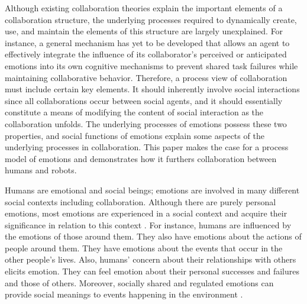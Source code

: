 Although existing collaboration theories explain the important elements of a
collaboration structure, the underlying processes required to dynamically
create, use, and maintain the elements of this structure are largely
unexplained. For instance, a general mechanism has yet to be developed that
allows an agent to effectively integrate the influence of its collaborator's
perceived or anticipated emotions into its own cognitive mechanisms to prevent
shared task failures while maintaining collaborative behavior. Therefore, a
process view of collaboration must include certain key elements. It should
inherently involve social interactions since all collaborations occur between
social agents, and it should essentially constitute a means of modifying the
content of social interaction as the collaboration unfolds. The underlying
processes of emotions possess these two properties, and social functions of
emotions explain some aspects of the underlying processes in collaboration. This
paper makes the case for a process model of emotions and demonstrates how it
furthers collaboration between humans and robots.

Humans are emotional and social beings; emotions are involved in many different
social contexts including collaboration. Although there are purely personal
emotions, most emotions are experienced in a social context and acquire their
significance in relation to this context
\cite{parkinson:emotion-social-interaction}. For instance, humans are influenced
by the emotions of those around them. They also have emotions about the actions
of people around them. They have emotions about the events that occur in the
other people's lives. Also, humans' concern about their relationships with
others elicits emotion. They can feel emotion about their personal successes and
failures and those of others. Moreover, socially shared and regulated emotions
can provide social meanings to events happening in the environment
\cite{wisecup:sociology-emotions}.

